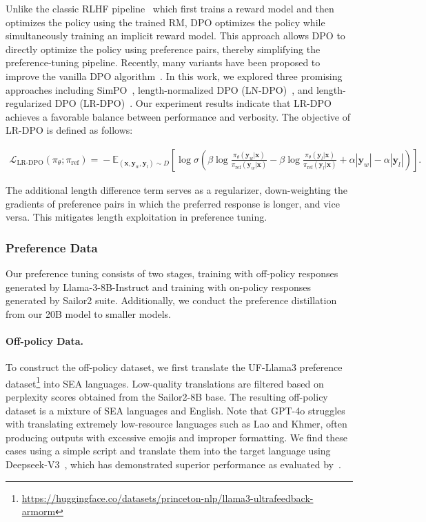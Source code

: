 Unlike the classic RLHF pipeline~\citep{ouyang2022training} which first trains a reward model and then optimizes the policy using the trained RM, DPO optimizes the policy while simultaneously training an implicit reward model. This approach allows DPO to directly optimize the policy using preference pairs, thereby simplifying the preference-tuning pipeline. Recently, many variants have been proposed to improve the vanilla DPO algorithm~\citep{meng2024simpo, mao2024simple, azar2024general, ethayarajhmodel}. In this work, we explored three promising approaches including SimPO~\citep{meng2024simpo}, length-normalized DPO (LN-DPO)~\citep{rafailov2024direct}, and length-regularized DPO (LR-DPO)~\citep{park2024disentangling}. Our experiment results indicate that LR-DPO achieves a favorable balance between performance and verbosity. The objective of LR-DPO is defined as follows: 

{\small
\begin{align}
    \!\!\mathcal{L}_{\text{LR-DPO}}(\pi_\theta; \pi_{\text{ref}})\!=\!-\mathbb{E}_{(\mathbf{x}, \mathbf{y}_w, \mathbf{y}_l) \sim D} \left[ \log \sigma \left(
    \beta \log \frac{\pi_\theta(\mathbf{y}_w|\mathbf{x})}{\pi_{\text{ref}}(\mathbf{y}_w|\mathbf{x})} -
    \beta \log \frac{\pi_\theta(\mathbf{y}_l|\mathbf{x})}{\pi_{\text{ref}}(\mathbf{y}_l|\mathbf{x})} +
    \alpha |\mathbf{y}_w| - \alpha |\mathbf{y}_l| \right) \right].\!\!
\end{align}
}

The additional length difference term serves as a regularizer, down-weighting the gradients of preference pairs in which the preferred response is longer, and vice versa. This mitigates length exploitation in preference tuning.


\subsubsection{Preference Data}\label{sec.pt.data}

Our preference tuning consists of two stages, training with off-policy responses generated by Llama-3-8B-Instruct and training with on-policy responses generated by Sailor2 suite. Additionally, we conduct the preference distillation from our 20B model to smaller models. 

\paragraph{Off-policy Data.} To construct the off-policy dataset, we first translate the UF-Llama3 preference dataset\footnote{\url{https://huggingface.co/datasets/princeton-nlp/llama3-ultrafeedback-armorm}} into SEA languages. 
Low-quality translations are filtered based on perplexity scores obtained from the Sailor2-8B base. The resulting off-policy dataset is a mixture of SEA languages and English. 
Note that GPT-4o struggles with translating extremely low-resource languages such as Lao and Khmer, often producing outputs with excessive emojis and improper formatting. We find these cases using a simple script and translate them into the target language using Deepseek-V3~\citep{deepseekai2024deepseekv3technicalreport}, which has demonstrated superior performance as evaluated by~\cite{Huang2025BenchMAXAC}.

